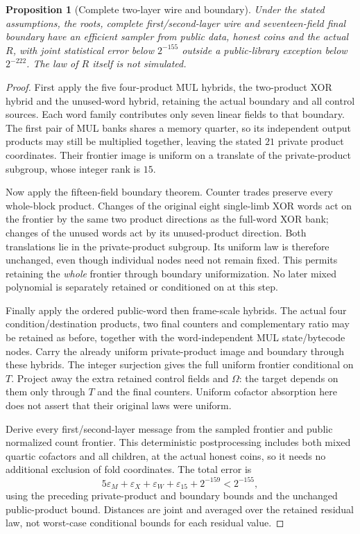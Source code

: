 \documentclass[11pt]{article}
\newtheorem{proposition}{Proposition}
\begin{document}
\begin{proposition}[Complete two-layer wire and boundary]
Under the stated assumptions, the roots, complete first/second-layer wire and seventeen-field final boundary have an efficient sampler from public data, honest coins and the actual $R$, with joint statistical error below $2^{-155}$ outside a public-library exception below $2^{-222}$. The law of $R$ itself is not simulated.
\end{proposition}
\begin{proof}
First apply the five four-product MUL hybrids, the two-product XOR hybrid and the unused-word hybrid, retaining the actual boundary and all control sources. Each word family contributes only seven linear fields to that boundary. The first pair of MUL banks shares a memory quarter, so its independent output products may still be multiplied together, leaving the stated $21$ private product coordinates. Their frontier image is uniform on a translate of the private-product subgroup, whose integer rank is $15$.

Now apply the fifteen-field boundary theorem. Counter trades preserve every whole-block product. Changes of the original eight single-limb XOR words act on the frontier by the same two product directions as the full-word XOR bank; changes of the unused words act by its unused-product direction. Both translations lie in the private-product subgroup. Its uniform law is therefore unchanged, even though individual nodes need not remain fixed. This permits retaining the \emph{whole} frontier through boundary uniformization. No later mixed polynomial is separately retained or conditioned on at this step.

Finally apply the ordered public-word then frame-scale hybrids. The actual four condition/destination products, two final counters and complementary ratio may be retained as before, together with the word-independent MUL state/bytecode nodes. Carry the already uniform private-product image and boundary through these hybrids. The integer surjection gives the full uniform frontier conditional on $T$. Project away the extra retained control fields and $\Omega$: the target depends on them only through $T$ and the final counters. Uniform cofactor absorption here does not assert that their original laws were uniform.

Derive every first/second-layer message from the sampled frontier and public normalized count frontier. This deterministic postprocessing includes both mixed quartic cofactors and all children, at the actual honest coins, so it needs no additional exclusion of fold coordinates. The total error is
\[
 5\varepsilon_M+\varepsilon_X+\varepsilon_W+\varepsilon_{15}
      +2^{-159}<2^{-155},
\]
using the preceding private-product and boundary bounds and the unchanged public-product bound. Distances are joint and averaged over the retained residual law, not worst-case conditional bounds for each residual value.
\end{proof}
\end{document}

